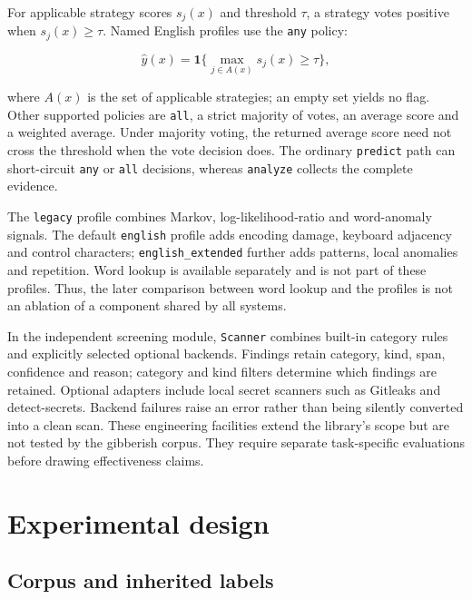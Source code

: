 \documentclass[10pt,a4paper,twocolumn]{article}
\begin{document}
For applicable strategy scores \(s_j(x)\) and threshold \(\tau\), a
strategy votes positive when \(s_j(x)\geq\tau\). Named English profiles
use the \texttt{any} policy:

\begin{equation}
\widehat y(x)=\mathbf{1}\{\max_{j\in A(x)}s_j(x)\geq\tau\},
\end{equation}

where \(A(x)\) is the set of applicable strategies; an empty set yields
no flag. Other supported policies are \texttt{all}, a strict majority of
votes, an average score and a weighted average. Under majority voting,
the returned average score need not cross the threshold when the vote
decision does. The ordinary \texttt{predict} path can short-circuit
\texttt{any} or \texttt{all} decisions, whereas \texttt{analyze}
collects the complete evidence.

The \texttt{legacy} profile combines Markov, log-likelihood-ratio and
word-anomaly signals. The default \texttt{english} profile adds encoding
damage, keyboard adjacency and control characters;
\texttt{english\_extended} further adds patterns, local anomalies and
repetition. Word lookup is available separately and is not part of these
profiles. Thus, the later comparison between word lookup and the
profiles is not an ablation of a component shared by all systems.

In the independent screening module, \texttt{Scanner} combines built-in
category rules and explicitly selected optional backends. Findings
retain category, kind, span, confidence and reason; category and kind
filters determine which findings are retained. Optional adapters include
local secret scanners such as Gitleaks and detect-secrets. Backend
failures raise an error rather than being silently converted into a
clean scan. These engineering facilities extend the library's scope but
are not tested by the gibberish corpus. They require separate
task-specific evaluations before drawing effectiveness claims.

\section{Experimental design}\label{experimental-design}

\subsection{Corpus and inherited
labels}\label{corpus-and-inherited-labels}
\end{document}
